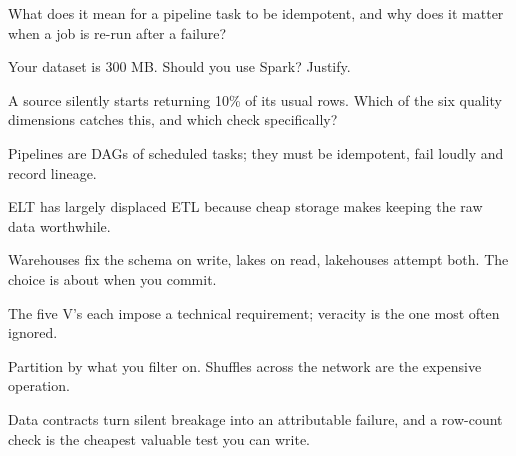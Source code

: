 \begin{checkpoint}
\begin{tightnum}
  \item What does it mean for a pipeline task to be idempotent, and why does it
        matter when a job is re-run after a failure?
  \item Your dataset is 300 MB. Should you use Spark? Justify.
  \item A source silently starts returning 10\% of its usual rows. Which of the six
        quality dimensions catches this, and which check specifically?
\end{tightnum}
\end{checkpoint}

\begin{chaptersummary}
\begin{tight}
  \item Pipelines are DAGs of scheduled tasks; they must be idempotent, fail loudly
        and record lineage.
  \item ELT has largely displaced ETL because cheap storage makes keeping the raw
        data worthwhile.
  \item Warehouses fix the schema on write, lakes on read, lakehouses attempt both.
        The choice is about when you commit.
  \item The five V's each impose a technical requirement; veracity is the one most
        often ignored.
  \item Partition by what you filter on. Shuffles across the network are the
        expensive operation.
  \item Data contracts turn silent breakage into an attributable failure, and a
        row-count check is the cheapest valuable test you can write.
\end{tight}
\end{chaptersummary}

